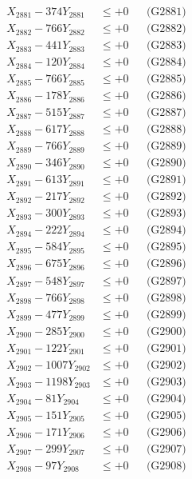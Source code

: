 \documentclass[a4paper,10pt]{article}
\begin{document}
{\begin{align}
\allowbreak
X_{2881} - 374Y_{2881} &\leq +0 && \text{(G2881)} \\
X_{2882} - 766Y_{2882} &\leq +0 && \text{(G2882)} \\
X_{2883} - 441Y_{2883} &\leq +0 && \text{(G2883)} \\
X_{2884} - 120Y_{2884} &\leq +0 && \text{(G2884)} \\
X_{2885} - 766Y_{2885} &\leq +0 && \text{(G2885)} \\
X_{2886} - 178Y_{2886} &\leq +0 && \text{(G2886)} \\
X_{2887} - 515Y_{2887} &\leq +0 && \text{(G2887)} \\
X_{2888} - 617Y_{2888} &\leq +0 && \text{(G2888)} \\
X_{2889} - 766Y_{2889} &\leq +0 && \text{(G2889)} \\
X_{2890} - 346Y_{2890} &\leq +0 && \text{(G2890)} \\
\allowbreak
X_{2891} - 613Y_{2891} &\leq +0 && \text{(G2891)} \\
X_{2892} - 217Y_{2892} &\leq +0 && \text{(G2892)} \\
X_{2893} - 300Y_{2893} &\leq +0 && \text{(G2893)} \\
X_{2894} - 222Y_{2894} &\leq +0 && \text{(G2894)} \\
X_{2895} - 584Y_{2895} &\leq +0 && \text{(G2895)} \\
X_{2896} - 675Y_{2896} &\leq +0 && \text{(G2896)} \\
X_{2897} - 548Y_{2897} &\leq +0 && \text{(G2897)} \\
X_{2898} - 766Y_{2898} &\leq +0 && \text{(G2898)} \\
X_{2899} - 477Y_{2899} &\leq +0 && \text{(G2899)} \\
X_{2900} - 285Y_{2900} &\leq +0 && \text{(G2900)} \\
\allowbreak
X_{2901} - 122Y_{2901} &\leq +0 && \text{(G2901)} \\
X_{2902} - 1007Y_{2902} &\leq +0 && \text{(G2902)} \\
X_{2903} - 1198Y_{2903} &\leq +0 && \text{(G2903)} \\
X_{2904} - 81Y_{2904} &\leq +0 && \text{(G2904)} \\
X_{2905} - 151Y_{2905} &\leq +0 && \text{(G2905)} \\
X_{2906} - 171Y_{2906} &\leq +0 && \text{(G2906)} \\
X_{2907} - 299Y_{2907} &\leq +0 && \text{(G2907)} \\
X_{2908} - 97Y_{2908} &\leq +0 && \text{(G2908)} \\

\end{align}}
\end{document}
